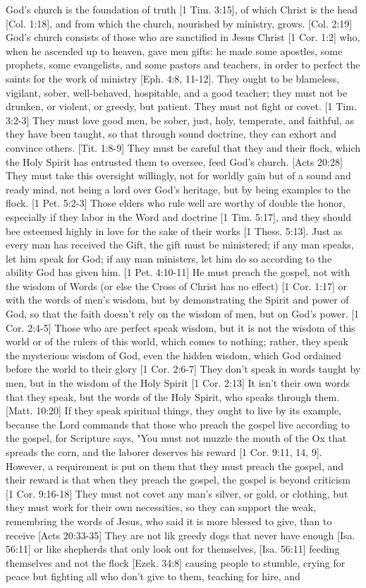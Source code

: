 \documentclass[../main.tex]{subfiles}
\begin{document}
	God's church is the foundation of truth [1 Tim. 3:15], of which Christ is the head [Col. 1:18], and from which the church, nourished by ministry, grows. [Col. 2:19] God's church consists of those who are sanctified in Jesus Christ [1 Cor. 1:2] who, when he ascended up to heaven, gave men gifts: he made some apostles, some prophets, some evangelists, and some pastors and teachers, in order to perfect the saints for the work of ministry [Eph. 4:8, 11-12]. They ought to be blameless, vigilant, sober, well-behaved, hospitable, and a good teacher; they must not be drunken, or violent, or greedy, but patient.  They must not fight or covet. [1 Tim. 3:2-3] They must love good men, be sober, just, holy, temperate, and faithful, as they have been taught, so that through sound doctrine, they can exhort and convince others. [Tit. 1:8-9] They must be careful that they and their flock, which the Holy Spirit has entrusted them to oversee, feed God's church. [Acts 20:28] They must take this oversight willingly, not for worldly gain but of a sound and ready mind, not being a lord over God's heritage, but by being examples to the flock. [1 Pet. 5:2-3] Those elders who rule well are worthy of double the honor, especially if they labor in the Word and doctrine [1 Tim. 5:17], and they should bee esteemed highly in love for the sake of their works [1 Thess. 5:13]. Just as every man has received the Gift, the gift must be ministered; if any man speaks, let him speak for God; if any man ministers, let him do so according to the ability God has given him. [1 Pet. 4:10-11] He must preach the gospel, not with the wisdom of Words (or else the Cross of Christ has no effect) [1 Cor. 1:17] or with the words of men's wisdom, but by demonstrating the Spirit and power of God, so that the faith doesn't rely on the wisdom of men, but on God's power. [1 Cor. 2:4-5] Those who are perfect speak wisdom, but it is not the wisdom of this world or of the rulers of this world, which comes to nothing; rather, they speak the mysterious wisdom of God, even the hidden wisdom, which God ordained before the world to their glory [1 Cor. 2:6-7] They don't speak in words taught by men, but in the wisdom of the Holy Spirit [1 Cor. 2:13] It isn't their own words that they speak, but the words of the Holy Spirit, who speaks through them. [Matt. 10:20] If they speak spiritual things, they ought to live by its example, because the Lord commands that those who preach the gospel live according to the gospel, for Scripture says, "You must not muzzle the mouth of the Ox that spreads the corn, and the laborer deserves his reward [1 Cor. 9:11, 14, 9]. However, a requirement is put on them that they must preach the gospel, and their reward is that when they preach the gospel, the gospel is beyond criticism [1 Cor. 9:16-18] They must not covet any man's silver, or gold, or clothing, but they must work for their own necessities, so they can support the weak, remembring the words of Jesus, who said it is more blessed to give, than to receive [Acts 20:33-35] They are not lik greedy dogs that never have enough [Isa. 56:11] or like shepherds that only look out for themselves, [Isa. 56:11] feeding themselves and not the flock [Ezek. 34:8] causing people to stumble, crying for peace but fighting all who don't give to them, teaching for hire, and 
\end{document}
